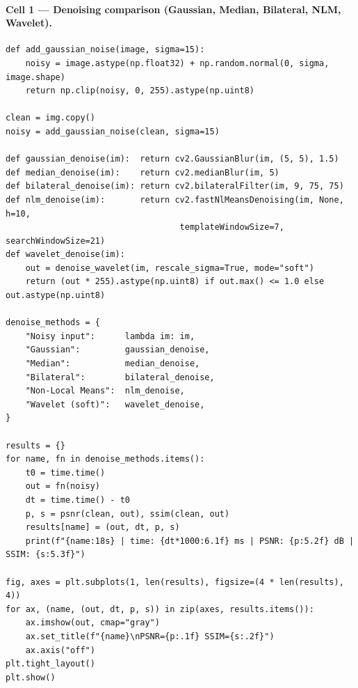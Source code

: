 \documentclass[12pt, a4paper]{article}
\begin{document}
\paragraph{Cell 1 --- Denoising comparison (Gaussian, Median, Bilateral, NLM, Wavelet).}
\begin{lstlisting}
def add_gaussian_noise(image, sigma=15):
    noisy = image.astype(np.float32) + np.random.normal(0, sigma, image.shape)
    return np.clip(noisy, 0, 255).astype(np.uint8)

clean = img.copy()
noisy = add_gaussian_noise(clean, sigma=15)

def gaussian_denoise(im):  return cv2.GaussianBlur(im, (5, 5), 1.5)
def median_denoise(im):    return cv2.medianBlur(im, 5)
def bilateral_denoise(im): return cv2.bilateralFilter(im, 9, 75, 75)
def nlm_denoise(im):       return cv2.fastNlMeansDenoising(im, None, h=10,
                                   templateWindowSize=7, searchWindowSize=21)
def wavelet_denoise(im):
    out = denoise_wavelet(im, rescale_sigma=True, mode="soft")
    return (out * 255).astype(np.uint8) if out.max() <= 1.0 else out.astype(np.uint8)

denoise_methods = {
    "Noisy input":      lambda im: im,
    "Gaussian":         gaussian_denoise,
    "Median":           median_denoise,
    "Bilateral":        bilateral_denoise,
    "Non-Local Means":  nlm_denoise,
    "Wavelet (soft)":   wavelet_denoise,
}

results = {}
for name, fn in denoise_methods.items():
    t0 = time.time()
    out = fn(noisy)
    dt = time.time() - t0
    p, s = psnr(clean, out), ssim(clean, out)
    results[name] = (out, dt, p, s)
    print(f"{name:18s} | time: {dt*1000:6.1f} ms | PSNR: {p:5.2f} dB | SSIM: {s:5.3f}")

fig, axes = plt.subplots(1, len(results), figsize=(4 * len(results), 4))
for ax, (name, (out, dt, p, s)) in zip(axes, results.items()):
    ax.imshow(out, cmap="gray")
    ax.set_title(f"{name}\nPSNR={p:.1f} SSIM={s:.2f}")
    ax.axis("off")
plt.tight_layout()
plt.show()
\end{lstlisting}
\end{document}
